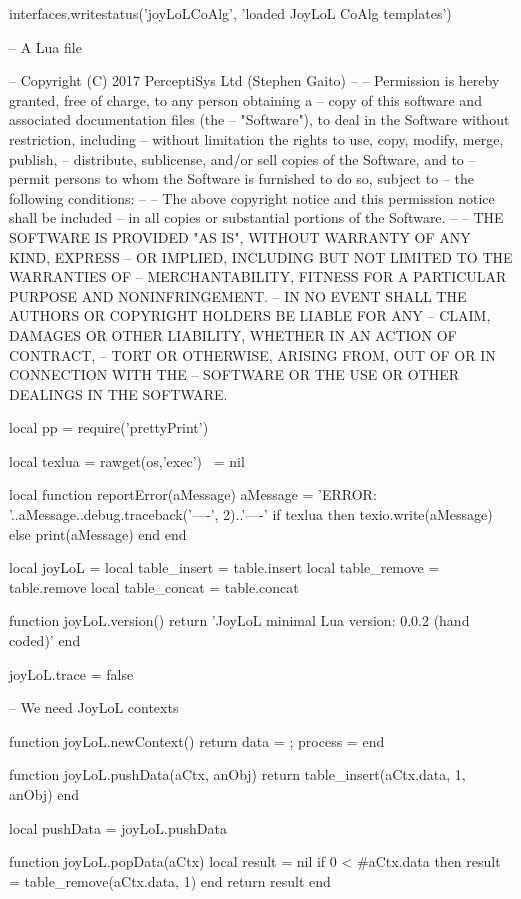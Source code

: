 interfaces.writestatus('joyLoLCoAlg', 'loaded JoyLoL CoAlg templates')
\stopLuaTemplate

\starttyping
{}
\startMinJoyLoL
-- A Lua file

-- Copyright (C) 2017 PerceptiSys Ltd (Stephen Gaito)
--
-- Permission is hereby granted, free of charge, to any person obtaining a 
-- copy of this software and associated documentation files (the 
-- "Software"), to deal in the Software without restriction, including 
-- without limitation the rights to use, copy, modify, merge, publish, 
-- distribute, sublicense, and/or sell copies of the Software, and to 
-- permit persons to whom the Software is furnished to do so, subject to 
-- the following conditions:
--
-- The above copyright notice and this permission notice shall be included 
-- in all copies or substantial portions of the Software.
--
-- THE SOFTWARE IS PROVIDED "AS IS", WITHOUT WARRANTY OF ANY KIND, EXPRESS 
-- OR IMPLIED, INCLUDING BUT NOT LIMITED TO THE WARRANTIES OF 
-- MERCHANTABILITY, FITNESS FOR A PARTICULAR PURPOSE AND NONINFRINGEMENT. 
-- IN NO EVENT SHALL THE AUTHORS OR COPYRIGHT HOLDERS BE LIABLE FOR ANY 
-- CLAIM, DAMAGES OR OTHER LIABILITY, WHETHER IN AN ACTION OF CONTRACT, 
-- TORT OR OTHERWISE, ARISING FROM, OUT OF OR IN CONNECTION WITH THE 
-- SOFTWARE OR THE USE OR OTHER DEALINGS IN THE SOFTWARE.

local pp = require('prettyPrint')

local texlua = rawget(os,'exec')    ~= nil

local function reportError(aMessage)
  aMessage = 'ERROR: '..aMessage..debug.traceback('\n----', 2)..'\n----\n'
  if texlua then
    texio.write(aMessage)
  else
    print(aMessage)
  end
end

local joyLoL = { }
local table_insert = table.insert
local table_remove = table.remove
local table_concat = table.concat

function joyLoL.version()
  return 'JoyLoL minimal Lua version: 0.0.2 (hand coded)'
end

joyLoL.trace = false

-- We need JoyLoL contexts

function joyLoL.newContext()
  return { data = { }; process = { } }
end

function joyLoL.pushData(aCtx, anObj)
  return table_insert(aCtx.data, 1, anObj)
end

local pushData = joyLoL.pushData

function joyLoL.popData(aCtx)
  local result = nil
  if 0 < #aCtx.data then
    result = table_remove(aCtx.data, 1)
  end
  return result
end

